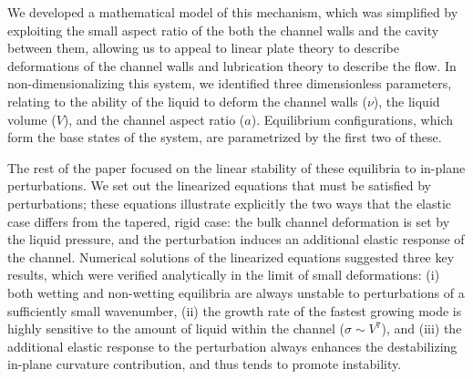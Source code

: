 \documentclass{jfm}
\begin{document}
We developed a mathematical model of this mechanism, which was simplified by exploiting the small aspect ratio of the both the channel walls and the cavity between them, allowing us to appeal to linear plate theory to describe deformations of the channel walls and lubrication theory to describe the flow. In non-dimensionalizing this system, we identified three dimensionless parameters, relating to the ability of the liquid to deform the channel walls ($\nu$), the liquid volume ($V$), and the channel aspect ratio ($a$). Equilibrium configurations, which form the base states of the system, are parametrized by the first two of these. 

The rest of the paper focused on the linear stability of these equilibria to in-plane perturbations. We set out the linearized equations that must be satisfied by perturbations; these equations illustrate explicitly the two ways that the elastic case differs from the tapered, rigid case: the bulk channel deformation is set by the liquid pressure, and the perturbation induces an additional elastic response of the channel. Numerical solutions of the linearized equations suggested three key results, which were verified analytically in the limit of small deformations: (i) both wetting and non-wetting equilibria are always unstable to perturbations of a sufficiently small wavenumber, (ii) the growth rate of the fastest growing mode is highly sensitive to the amount of liquid within the channel ($\sigma \sim V^7$), and (iii) the additional elastic response to the perturbation always enhances the destabilizing in-plane curvature contribution, and thus tends to promote instability.

\end{document}
